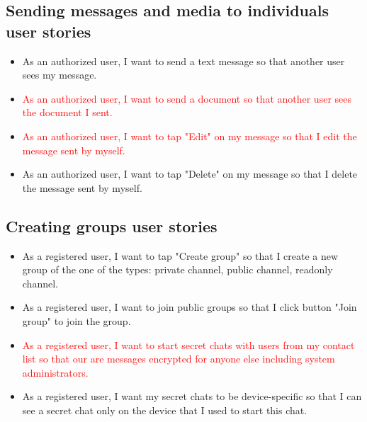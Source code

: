 \subsection{Sending messages and media to individuals user stories}
\label{subsec:sending-messages-and-media-feature-user-stories}
\begin{itemize}
    \item As an authorized user, I want to send a text message so that another user sees my message.
    \item \textcolor{red}{As an authorized user, I want to send a document so that another user sees the document I sent.}
    \item \textcolor{red}{As an authorized user, I want to tap "Edit" on my message so that I edit the message sent by myself.}
    \item As an authorized user, I want to tap "Delete" on my message so that I delete the message sent by myself.
\end{itemize}

\subsection{Creating groups user stories}\label{subsec:creating-groups-feature-user-stories}
\begin{itemize}
    \item As a registered user, I want to tap "Create group" so that I create a new group of the one of the types: private channel, public channel, readonly channel.
    \item As a registered user, I want to join public groups so that I click button "Join group" to join the group.
    \item \textcolor{red}{As a registered user, I want to start secret chats with users from my contact list so that our are messages encrypted for anyone else including system administrators.}
    \item As a registered user, I want my secret chats to be device-specific so that I can see a secret chat only on the device that I used to start this chat.
\end{itemize}

